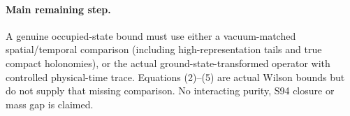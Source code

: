 \documentclass[11pt]{article}
\begin{document}
\paragraph{Main remaining step.}
A genuine occupied-state bound must use either a vacuum-matched spatial/temporal
comparison (including high-representation tails and true compact holonomies), or
the actual ground-state-transformed operator with controlled physical-time trace.
Equations (2)--(5) are actual Wilson bounds but do not supply that missing
comparison. No interacting purity, S94 closure or mass gap is claimed.
\end{document}
